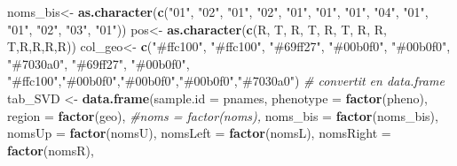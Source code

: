 \documentclass[
  openany]{book}
\newenvironment{Shaded}{\begin{snugshade}}{\end{snugshade}}
\newcommand{\AttributeTok}[1]{\textcolor[rgb]{0.13,0.29,0.53}{#1}}
\newcommand{\CommentTok}[1]{\textcolor[rgb]{0.56,0.35,0.01}{\textit{#1}}}
\newcommand{\FunctionTok}[1]{\textcolor[rgb]{0.13,0.29,0.53}{\textbf{#1}}}
\newcommand{\NormalTok}[1]{#1}
\newcommand{\OtherTok}[1]{\textcolor[rgb]{0.56,0.35,0.01}{#1}}
\newcommand{\StringTok}[1]{\textcolor[rgb]{0.31,0.60,0.02}{#1}}
\theoremstyle{definition}
\theoremstyle{definition}
\theoremstyle{definition}
\theoremstyle{definition}
\theoremstyle{remark}
\begin{document}
\begin{Shaded}
\begin{Highlighting}[]
\NormalTok{noms\_bis}\OtherTok{\textless{}{-}} \FunctionTok{as.character}\NormalTok{(}\FunctionTok{c}\NormalTok{(}\StringTok{"01"}\NormalTok{,   }\StringTok{"02"}\NormalTok{,  }\StringTok{"01"}\NormalTok{, }\StringTok{"02"}\NormalTok{,  }\StringTok{"01"}\NormalTok{, }\StringTok{"01"}\NormalTok{, }\StringTok{"01"}\NormalTok{, }\StringTok{"04"}\NormalTok{, }\StringTok{"01"}\NormalTok{, }\StringTok{"01"}\NormalTok{, }\StringTok{"02"}\NormalTok{, }\StringTok{"03"}\NormalTok{, }\StringTok{"01"}\NormalTok{))}
\NormalTok{pos}\OtherTok{\textless{}{-}} \FunctionTok{as.character}\NormalTok{(}\FunctionTok{c}\NormalTok{(}\StringTok{\textquotesingle{}R\textquotesingle{}}\NormalTok{,   }\StringTok{\textquotesingle{}T\textquotesingle{}}\NormalTok{,  }\StringTok{\textquotesingle{}R\textquotesingle{}}\NormalTok{, }\StringTok{\textquotesingle{}T\textquotesingle{}}\NormalTok{,   }\StringTok{\textquotesingle{}R\textquotesingle{}}\NormalTok{,  }\StringTok{\textquotesingle{}T\textquotesingle{}}\NormalTok{, }\StringTok{\textquotesingle{}R\textquotesingle{}}\NormalTok{,   }\StringTok{\textquotesingle{}R\textquotesingle{}}\NormalTok{,  }\StringTok{\textquotesingle{}T\textquotesingle{}}\NormalTok{,}\StringTok{\textquotesingle{}R\textquotesingle{}}\NormalTok{,}\StringTok{\textquotesingle{}R\textquotesingle{}}\NormalTok{,}\StringTok{\textquotesingle{}R\textquotesingle{}}\NormalTok{,}\StringTok{\textquotesingle{}R\textquotesingle{}}\NormalTok{))}
\NormalTok{col\_geo}\OtherTok{\textless{}{-}} \FunctionTok{c}\NormalTok{(}\StringTok{"\#ffc100"}\NormalTok{,   }\StringTok{"\#ffc100"}\NormalTok{,  }\StringTok{"\#69ff27"}\NormalTok{, }\StringTok{"\#00b0f0"}\NormalTok{, }\StringTok{"\#00b0f0"}\NormalTok{, }\StringTok{"\#7030a0"}\NormalTok{, }\StringTok{"\#69ff27"}\NormalTok{, }\StringTok{"\#00b0f0"}\NormalTok{,  }\StringTok{"\#ffc100"}\NormalTok{,}\StringTok{"\#00b0f0"}\NormalTok{,}\StringTok{"\#00b0f0"}\NormalTok{,}\StringTok{"\#00b0f0"}\NormalTok{,}\StringTok{"\#7030a0"}\NormalTok{)}
\CommentTok{\# convertit en data.frame}
\NormalTok{tab\_SVD }\OtherTok{\textless{}{-}} \FunctionTok{data.frame}\NormalTok{(}\AttributeTok{sample.id =}\NormalTok{ pnames,}
    \AttributeTok{phenotype =} \FunctionTok{factor}\NormalTok{(pheno),}
    \AttributeTok{region =} \FunctionTok{factor}\NormalTok{(geo),}
    \CommentTok{\#noms = factor(noms),}
    \AttributeTok{noms\_bis =} \FunctionTok{factor}\NormalTok{(noms\_bis),}
    \AttributeTok{nomsUp =} \FunctionTok{factor}\NormalTok{(nomsU),}
    \AttributeTok{nomsLeft =} \FunctionTok{factor}\NormalTok{(nomsL),}
    \AttributeTok{nomsRight =} \FunctionTok{factor}\NormalTok{(nomsR),}

\end{Highlighting}
\end{Shaded}
\end{document}
